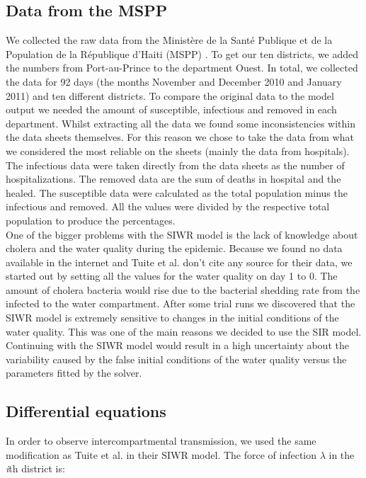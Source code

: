 \documentclass[11pt]{article}
\begin{document}
\subsection{Data from the MSPP}
We collected the raw data from the Minist\`{e}re de la Sant\'{e} Publique et de la Population de la R\'{e}publique d'Haiti (MSPP) \cite{web:MSPP}. To get our ten districts, we added the numbers from Port-au-Prince to the department Ouest. In total, we collected the data for 92 days (the months November and December 2010 and January 2011) and ten different districts. To compare the original data to the model output we needed the amount of susceptible, infectious and removed in each department. Whilst extracting all the data we found some inconsistencies within the data sheets themselves. For this reason we chose to take the data from what we considered the most reliable on the sheets (mainly the data from hospitals). The infectious data were taken directly from the data sheets as the number of hospitalizations. The removed data are the sum of deaths in hospital and the healed. The susceptible data were calculated as the total population minus the infectious and removed. All the values were divided by the respective total population to produce the percentages.\\
One of the bigger problems with the SIWR model is the lack of knowledge about cholera and the water quality during the epidemic. Because we found no data available in the internet and Tuite et al. \cite{tuite:2011} don't cite any source for their data, we started out by setting all the values for the water quality on day 1 to 0. The amount of cholera bacteria would rise due to the bacterial shedding rate from the infected to the water compartment. After some trial runs we discovered that the SIWR model is extremely sensitive to changes in the initial conditions of the water quality. This was one of the main reasons we decided to use the SIR model. Continuing with the SIWR model would result in a high uncertainty about the variability caused by the false initial conditions of the water quality versus the parameters fitted by the solver.






\subsection{Differential equations}
In order to observe intercompartmental transmission, we used the same modification as Tuite et al. \cite{tuite:2011} in their SIWR model. The force of infection $\lambda$ in the \textit{i}th district is:
\end{document}
